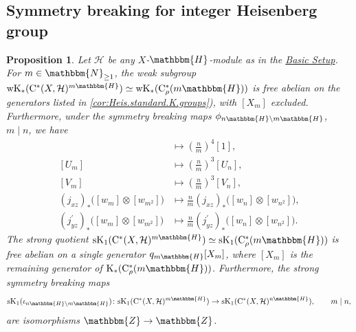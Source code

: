 \documentclass{amsart}
\numberwithin{figure}{section}
\numberwithin{equation}{section}
\numberwithin{table}{section}
\theoremstyle{plain}
\newtheorem{proposition}[equation]{Proposition}
\theoremstyle{definition}
\theoremstyle{remark}
\theoremstyle{nonumber}
\newcommand{\refbasicsetup}{\hyperref[basic_setup]{Basic Setup}}
\newcommand{\N}{\mathbb{N}}
\newcommand{\Z}{\mathbb{Z}}
\newcommand{\HH}{\mathbb{H}} %
\newcommand{\K}{\relax\ifmmode\operatorname{K}\else\textup{K}\fi}
\newcommand{\Cst}{\relax\ifmmode\mathrm{C}^*\else\textup{C*}\fi}
\newcommand{\Cstr}{\Cst_\rho} %
\renewcommand{\mathbb}{\mathbbm} %
\begin{document}
\subsection{Symmetry breaking for integer Heisenberg group}
\begin{proposition}\label{prop:Heis.symm.breaking.maps}
Let $\mathcal{H}$ be any
$X$-$\HH$-module as in the \refbasicsetup.
For $m\in\N_{\geq 1}$, the weak subgroup ${\rm wK}_*(\Cst(X,\mathcal{H})^{m\HH})\simeq
{\rm wK}_*(\Cstr(m\HH))$ is free abelian on the generators
listed in
\cref{cor:Heis.standard.K.groups}), with $[X_m]$ excluded. Furthermore, under the
symmetry breaking maps $\phi_{n\HH\backslash m\HH}$, $m\mid n$, we have
\begin{align*}
[1]&\mapsto \left(\frac{n}{m}\right)^4[1],\\
[U_m]&\mapsto \left(\frac{n}{m}\right)^3[U_n],\\
[V_m]&\mapsto \left(\frac{n}{m}\right)^3[V_n],\\
(j_{xz})_*\big([w_{m}]\otimes [w_{m^2}]\big) 
&\mapsto \frac{n}{m}(j_{xz})_*\big([w_{n}]\otimes [w_{n^2}]\big),\\
(j_{yz}^\prime)_*\big([w_{m}]\otimes [w_{m^2}]\big)&\mapsto \frac{n}{m}(j_{yz}^\prime)_*\big([w_{n}]\otimes [w_{n^2}]\big).
\end{align*}
The strong quotient ${\rm sK}_1(\Cst(X,\mathcal{H})^{m\HH})\simeq {\rm sK}_1(\Cstr(m\HH))$ is free abelian on a single generator $q_{m\HH}[X_m]$, where $[X_m]$ is the remaining generator of $\K_*(\Cstr(m\HH))$. Furthermore, the strong symmetry breaking maps
\[
{\rm sK}_1(\iota_{n\HH\backslash m\HH})\colon {\rm sK}_1(\Cst(X,\mathcal{H})^{m\HH})\to {\rm sK}_1(\Cst(X,\mathcal{H})^{n\HH}),\qquad m\mid n,
\]
are isomorphisms $\Z\to\Z$.

\end{proposition}
\end{document}
